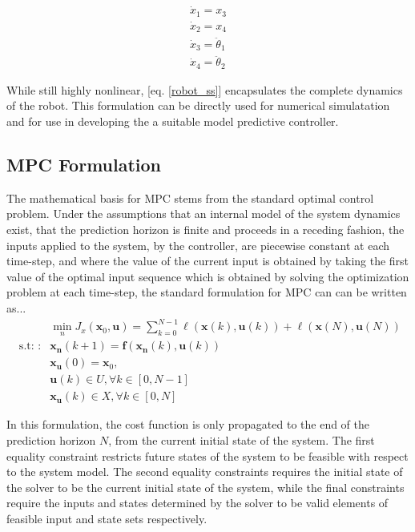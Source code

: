 \documentclass[journal]{IEEEtran}
\begin{document}
\begin{equation}\label{robot_ss}
\begin{array}{l}
\dot{x}_{1}=x_{3} \\
\dot{x}_{2}=x_{4} \\
\dot{x}_{3}=\ddot{\theta}_{1} \\
\dot{x}_{4}=\ddot{\theta}_{2}
\end{array}
\end{equation}

While still highly nonlinear, [eq. \ref{robot_ss}] encapsulates the complete dynamics of the robot. This formulation can be directly used for numerical simulatation and for use in developing the a suitable model predictive controller.


\subsection{MPC Formulation}
The mathematical basis for MPC stems from the standard optimal control problem. Under the assumptions that an internal model of the system dynamics exist, that the prediction horizon is finite and proceeds in a receding fashion, the inputs applied to the system, by the controller, are piecewise constant at each time-step, and where the value of the current input is obtained by taking the first value of the optimal input sequence which is obtained by solving the optimization problem at each time-step, \cite{rawlings_model_2017}the standard formulation for MPC can can be written as...
\begin{equation}
\begin{aligned}
& \min _{n} J_{x}\left(\mathbf{x}_{0}, \mathbf{u}\right)=\sum_{k=0}^{N-1} \ell\left(\mathbf{x}(k), \mathbf{u}(k)\right) + \ell\left(\mathbf{x}(N), \mathbf{u}(N)\right)\\
\text { s.t: }: & \mathbf{x}_{\mathbf{n}}(k+1)=\mathbf{f}\left(\mathbf{x}_{\mathbf{n}}(k), \mathbf{u}(k)\right) \\
& \mathbf{x}_{\mathbf{u}}(0)=\mathbf{x}_{0}, \\
& \mathbf{u}(k) \in U, \forall k \in[0, N-1] \\
& \mathbf{x}_{\mathbf{u}}(k) \in X, \forall k \in[0, N]
\end{aligned}
\end{equation}


In this formulation, the cost function is only propagated to the end of the prediction horizon $N$, from the current initial state of the system. The first equality constraint restricts future states of the system to be feasible with respect to the system model. The second equality constraints requires the initial state of the solver to be the current initial state of the system, while the final constraints require the inputs and states determined by the solver to be valid elements of feasible input and state sets respectively. \cite{borrelli_predictive_2017} \\
\end{document}
